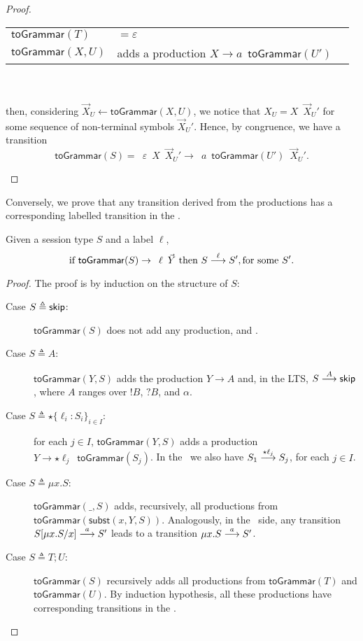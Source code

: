 \begin{proof}
\begin{itemize}
	    \begin{tabular}{lll}
			$\mathsf{toGrammar}(T)$ & $= \varepsilon$\\
			$\mathsf{toGrammar}(X,U)$ & adds a production 
			$X \rightarrow a \enspace \mathsf{toGrammar}(U')$
		\end{tabular}\\\\
		then, considering $\vec X_U \leftarrow \mathsf{toGrammar}(X,U)$, 
		we notice that $X_U = X \enspace \vec X_U'$ for some sequence of 
		non-terminal symbols $\vec X_U'$. Hence, by congruence, we have a 
		transition 
		\[\mathsf{toGrammar}(S) = \enspace \varepsilon \enspace X \enspace 
		\vec X_U' \rightarrow \enspace a \enspace \mathsf{toGrammar}(U') \enspace 
		\vec X_U'.\]
\end{itemize}
\end{proof}

Conversely, we prove that any transition derived from the productions 
has a corresponding labelled transition in the \LTS.

\begin{lemma}
Given a session type $S$ and a label $\ell$,
	\[ \text{if } \mathsf{toGrammar}(S) \rightarrow \enspace \ell \enspace 
	 \vec Y \text{ then } S \LTSderives[\ell] S', \text{for some $S'$}.\]
\end{lemma}

\begin{proof}
	The proof is by induction on the structure of $S$:
	\begin{description}
		\item[Case $S \triangleq \skipk$:] $\mathsf{toGrammar}(S)$ does not 
		     add any production, and .
		\item[Case $S \triangleq A$:] $\mathsf{toGrammar}(Y,S)$ adds the 
		     production $Y\rightarrow A$ and, in the LTS, $S \LTSderives[A] 
		     \skipk$, where $A$ ranges over $!B$, $?B$, and $\alpha$.
		\item[Case $S\triangleq \star \{\ell_i : S_i\}_{i\in I}$:] for each 
		     $j\in I$, $\mathsf{toGrammar}(Y,S)$ adds a production 
		     \linebreak $Y \rightarrow \star \ell_j \enspace 
		     \mathsf{toGrammar}(S_j)$. In the \LTS\ we also have 
		     $S_1 \LTSderives[\star \ell_j] S_j$, for each $j\in I$.
		\item[Case $S\triangleq \mu x.S$:] $\mathsf{toGrammar}(\_,S)$ adds, 
		     recursively, all productions from \linebreak$\mathsf{toGrammar}
		     (\mathsf{subst}(x,Y,S))$. Analogously, in the \LTS\ side, any transition 
		     $S[\mu x.S/x] \LTSderives[a] S'$ leads to a transition 
		     $\mu x.S \LTSderives[a] S'$.
		\item[Case $S \triangleq T;U$:] $\mathsf{toGrammar}(S)$ recursively adds 
		     all productions from  $\mathsf{toGrammar}(T)$ and $\mathsf{toGrammar}(U)$.
		     By induction hypothesis, all these productions have corresponding 
		     transitions in the \LTS.
	\end{description}
\end{proof}

